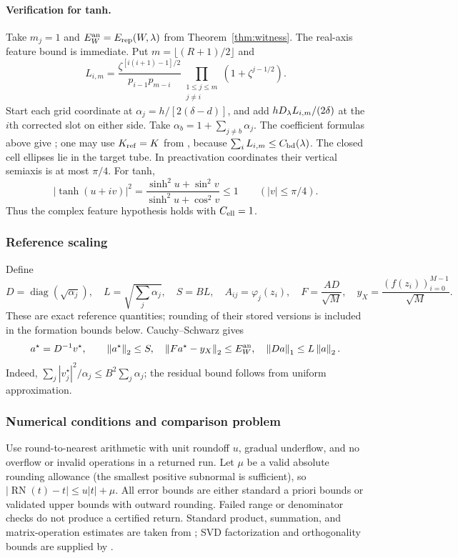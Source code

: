 \paragraph{Verification for tanh.}
Take $m_j=1$ and $E_W^{\rm an}=E_{\mathrm{rep}}(W,\lambda)$ from
Theorem~\ref{thm:witness}. The real-axis feature bound is immediate.
Put $m=\lfloor(R+1)/2\rfloor$ and
\begin{equation}
 L_{i,m}=\frac{\zeta^{[i(i+1)-1]/2}}{p_{i-1}p_{m-i}}
             \prod_{\substack{1\le j\le m\\j\ne i}}(1+\zeta^{j-1/2}).
 \label{eq:Lim}
\end{equation}
Start each grid coordinate at $\alpha_j=h/[2(\delta-d)]$, and add
$hD_\lambda L_{i,m}/(2\delta)$ at the $i$th corrected slot on either side.
Take $\alpha_b=1+\sum_{j\ne b}\alpha_j$. The coefficient formulas above give
; one may use $K_{\rm ref}=K$ from
, because $\sum_iL_{i,m}\le C_{\mathrm{bd}}(\lambda)$.
The closed cell ellipses lie in the target tube. In preactivation coordinates
their vertical semiaxis is at most $\pi/4$. For tanh,
\[
 |\tanh(u+iv)|^2=\frac{\sinh^2u+\sin^2v}{\sinh^2u+\cos^2v}\le1
 \qquad(|v|\le\pi/4).
\]
Thus the complex feature hypothesis holds with $C_{\rm ell}=1$.

\subsubsection{Reference scaling}
Define
\begin{equation}
 D=\operatorname{diag}(\sqrt{\alpha_j}),\quad
 L=\sqrt{\sum_j\alpha_j},\quad S=BL,\quad
 A_{ij}=\varphi_j(z_i),\quad
 F=\frac{AD}{\sqrt M},\quad y_X=\frac{(f(z_i))_{i=0}^{M-1}}{\sqrt M}.
 \label{eq:scaling}
\end{equation}
These are exact reference quantities; rounding of their stored versions is
included in the formation bounds below. Cauchy--Schwarz gives
\begin{equation}
 a^\star=D^{-1}v^\star,\qquad
 \left\lVert a^\star\right\rVert_2\le S,\quad
 \left\lVert Fa^\star-y_X\right\rVert_2\le E_W^{\rm an},\quad
 \left\lVert Da\right\rVert_1\le L\left\lVert a\right\rVert_2.
 \label{eq:scaled-witness}
\end{equation}
Indeed, $\sum_j|v_j^\star|^2/\alpha_j\le B^2\sum_j\alpha_j$;
the residual bound follows from uniform approximation.

\subsubsection{Numerical conditions and comparison problem}
Use round-to-nearest arithmetic with unit roundoff $u$, gradual underflow,
and no overflow or invalid operations in a returned run. Let $\mu$ be a
valid absolute rounding allowance (the smallest positive subnormal is
sufficient), so $|\operatorname{RN}(t)-t|\le u|t|+\mu$.
All error bounds are either standard a priori bounds or validated upper
bounds with outward rounding. Failed range or denominator checks do not
produce a certified return. Standard product, summation, and matrix-operation
estimates are taken from \cite[Chs.~2--4]{Higham2002}; SVD factorization
and orthogonality bounds are supplied by \cite[Ch.~4]{LAPACK1999}.

